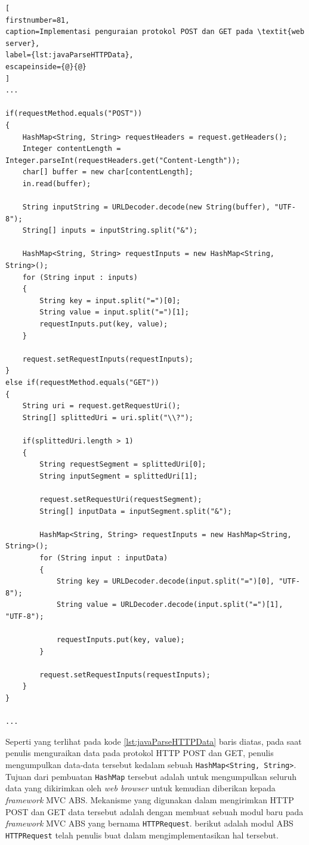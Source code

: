 \begin{lstlisting}[
firstnumber=81,
caption=Implementasi penguraian protokol POST dan GET pada \textit{web server},
label={lst:javaParseHTTPData},
escapeinside={@}{@}
]
...

if(requestMethod.equals("POST"))
{
   	HashMap<String, String> requestHeaders = request.getHeaders();
   	Integer contentLength = Integer.parseInt(requestHeaders.get("Content-Length"));
   	char[] buffer = new char[contentLength];
   	in.read(buffer);
   	
   	String inputString = URLDecoder.decode(new String(buffer), "UTF-8");
   	String[] inputs = inputString.split("&");
   	
   	HashMap<String, String> requestInputs = new HashMap<String, String>();
   	for (String input : inputs) 
   	{
		String key = input.split("=")[0];
		String value = input.split("=")[1];
		requestInputs.put(key, value);
	}
            	
    request.setRequestInputs(requestInputs);
}
else if(requestMethod.equals("GET"))
{
   	String uri = request.getRequestUri();
   	String[] splittedUri = uri.split("\\?");
   	
   	if(splittedUri.length > 1)
   	{
   		String requestSegment = splittedUri[0];
   		String inputSegment = splittedUri[1];
   		
   		request.setRequestUri(requestSegment);
   		String[] inputData = inputSegment.split("&");

   		HashMap<String, String> requestInputs = new HashMap<String, String>();
   		for (String input : inputData) 
   		{
   			String key = URLDecoder.decode(input.split("=")[0], "UTF-8");
   			String value = URLDecoder.decode(input.split("=")[1], "UTF-8");
   			
   			requestInputs.put(key, value);
		}
            		
   		request.setRequestInputs(requestInputs);
   	}
}

...
\end{lstlisting}

Seperti yang terlihat pada kode \ref{lst:javaParseHTTPData} baris diatas, pada saat penulis menguraikan data pada protokol HTTP POST dan GET, penulis mengumpulkan data-data tersebut kedalam sebuah \texttt{HashMap<String, String>}. Tujuan dari pembuatan \texttt{HashMap} tersebut adalah untuk mengumpulkan seluruh data yang dikirimkan oleh \textit{web browser} untuk kemudian diberikan kepada \textit{framework} MVC ABS. Mekanisme yang digunakan dalam mengirimkan HTTP POST dan GET data tersebut adalah dengan membuat sebuah modul baru pada \textit{framework} MVC ABS yang bernama \texttt{HTTPRequest}. berikut adalah modul ABS \texttt{HTTPRequest} telah penulis buat dalam mengimplementasikan hal tersebut.

